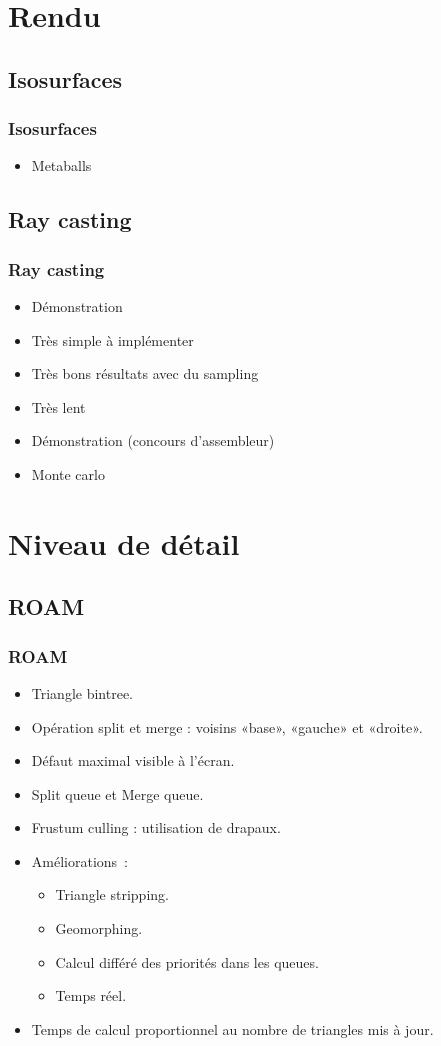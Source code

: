 \documentclass{beamer}
\begin{document}
\section{Rendu}

\subsection{Isosurfaces}
\begin{frame}
  \frametitle{Isosurfaces}
  \begin{itemize}
    \item Metaballs
  \end{itemize}
\end{frame}

\subsection{Ray casting}

\begin{frame}
  \frametitle{Ray casting}
  \begin{itemize}
  \item Démonstration
  \item Très simple à implémenter
  \item Très bons résultats avec du sampling
  \item Très lent
  \item Démonstration (concours d'assembleur)
  \item Monte carlo
  \end{itemize}
\end{frame}

\section[LOD]{Niveau de détail}

\subsection{ROAM}
\begin{frame}
  \frametitle{ROAM}
  \begin{itemize}
  \item Triangle bintree.
  \item Opération split et merge : voisins «base», «gauche» et «droite».
  \item Défaut maximal visible à l'écran.
  \item Split queue et Merge queue.
  \item Frustum culling : utilisation de drapaux.
  \item Améliorations~:
    \begin{itemize}
    \item Triangle stripping.
    \item Geomorphing.
    \item Calcul différé des priorités dans les queues.
    \item Temps réel.
    \end{itemize}
  \item Temps de calcul proportionnel au nombre de triangles mis à jour.
  \end{itemize}
\end{frame}
\end{document}
